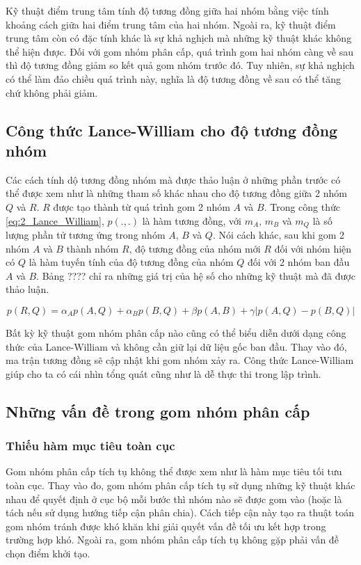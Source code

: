 Kỹ thuật điểm trung tâm tính độ tương đồng giữa hai nhóm bằng việc tính khoảng cách giữa hai điểm trung tâm của hai nhóm.
Ngoài ra, kỹ thuật điểm trung tâm còn có đặc tính khác là sự khả nghịch mà những kỹ thuật khác không thể hiện được.
Đối với gom nhóm phân cấp, quá trình gom hai nhóm càng về sau thì độ tương đồng giảm so kết quả gom nhóm trước đó.
Tuy nhiên, sự khả nghịch có thể làm đảo chiều quá trình này, nghĩa là độ tương đồng về sau có thể tăng chứ không phải giảm.

\subsection{Công thức Lance-William cho độ tương đồng nhóm}
Các cách tính dộ tương đồng nhóm mà được thảo luận ở những phần trước có thể được xem như là những tham số khác nhau cho độ tương đồng giữa 2 nhóm $Q$ và $R$.
$R$ được tạo thành từ quá trình gom 2 nhóm $A$ và $B$.
Trong công thức \ref{eq:2_Lance_William}, $p(.,.)$ là hàm tương đồng, với $m_A, \, m_B$ và $m_Q$ là số lượng phần tử tương ứng trong nhóm $A, \, B$ và $Q$.
Nói cách khác, sau khi gom 2 nhóm $A$ và $B$ thành nhóm $R$, độ tương đồng của nhóm mới $R$ đối với nhóm hiện có $Q$ là hàm tuyến tính của độ tương đồng của nhóm $Q$ đối với 2 nhóm ban đầu $A$ và $B$.
Bảng ???? chỉ ra những giá trị của hệ số cho những kỹ thuật mà đã được thảo luận.

\begin{equation}
\label{eq:2_Lance_William}
p(R,Q)=\alpha_Ap(A,Q) + \alpha_Bp(B,Q) + \beta p(A,B) + \gamma |p(A, Q) - p(B, Q)|
\end{equation}

Bất kỳ kỹ thuật gom nhóm phân cấp nào cũng có thể biểu diễn dưới dạng công thức của Lance-William và không cần giữ lại dữ liệu gốc ban đầu.
Thay vào đó, ma trận tương đồng sẽ cập nhật khi gom nhóm xảy ra.
Công thức Lance-William giúp cho ta có cái nhìn tổng quát cũng như là dễ thực thi trong lập trình.

\subsection{Những vấn đề trong gom nhóm phân cấp}
\subsubsection{Thiếu hàm mục tiêu toàn cục}
Gom nhóm phân cấp tích tụ không thể được xem như là hàm mục tiêu tối tưu toàn cục.
Thay vào đo, gom nhóm phân cấp tích tụ sử dụng những kỹ thuật khác nhau để quyết định ở cục bộ mỗi bước thì nhóm nào sẽ được gom vào (hoặc là tách nếu sử dụng hướng tiếp cận phân chia).
Cách tiếp cận này tạo ra thuật toán gom nhóm tránh được khó khăn khi giải quyết vấn đề tối ưu kết hợp trong trường hợp khó.
Ngoài ra, gom nhóm phân cấp tích tụ không gặp phải vấn đề chọn điểm khởi tạo.

